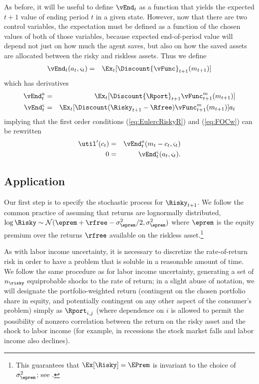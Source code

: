 \documentclass[titlepage]{\econtex}
\begin{document}
As before, it will be useful to define $\vEnd_{t}$ as a function that
yields the expected $t+1$ value of ending period $t$ in a given state.
However, now that there are two control variables, the expectation
must be defined as a function of the chosen values of both of those
variables, because expected end-of-period value will depend not just
on how much the agent saves, but also on how the saved assets are
allocated between the risky and riskless assets.  Thus we define
\begin{eqnarray*}
  \vEnd_{t}({a}_{t},\varsigma_{t}) & = & \Ex_{t}[\Discount {\vFunc}_{t+1}({m}_{t+1})]
\end{eqnarray*}
which has derivatives
\begin{eqnarray*}
  \vEnd_{t}^{{a}} & = & \Ex_{t}[\Discount {\Rport}_{t+1}{\vFunc}_{t+1}^{m}({m}_{t+1})]
  \\      \vEnd_{t}^{\varsigma} & = & \Ex_{t}[\Discount (\Risky_{t+1}-\Rfree){\vFunc}_{t+1}^{m}({m}_{t+1})  ]a_{t}
\end{eqnarray*}
implying that the first order conditions (\ref{eq:EulercRiskyR}) and
(\ref{eq:FOCw}) can be rewritten
\begin{eqnarray}
  \util^{\prime}({c}_{t}) & = & \vEnd_{t}^{{a}}({m}_{t}-{c}_{t},\varsigma_{t})
  \\      0 & = & \vEnd^{\varsigma}_{t}({a}_{t},\varsigma_{t}).
\end{eqnarray}

\subsection{Application}

Our first step is to specify the stochastic process for $\Risky_{t+1}$.
We follow the common practice of assuming that returns are
lognormally distributed, $\log \Risky \sim
\mathcal{N}(\eprem+\rfree-\sigma^{2}_{\eprem}/2,\sigma^{2}_{\eprem})$ where $\eprem$ is the equity premium
over the returns $\rfree$ available on the riskless asset.\footnote{This guarantees that $\Ex[\Risky] = \EPrem$ is invariant to the choice of $\sigma^{2}_{\eprem}$; see .}

As with labor income uncertainty, it is necessary to discretize the
rate-of-return risk in order to have a problem that is soluble in a
reasonable amount of time.  We follow the same procedure as for labor
income uncertainty, generating a set of $n_{\risky}$ equiprobable shocks to the
rate of return; in a slight abuse of notation, we will designate
the portfolio-weighted return (contingent on the
chosen portfolio share in equity, and potentially contingent on any other
aspect of the consumer's problem) simply as $\Rport_{i,j}$ (where dependence
on $i$ is allowed to permit the possibility of nonzero correlation
between the return on the risky asset and the shock to labor income (for example,
in recessions the stock market falls and labor income also declines).
\end{document}
